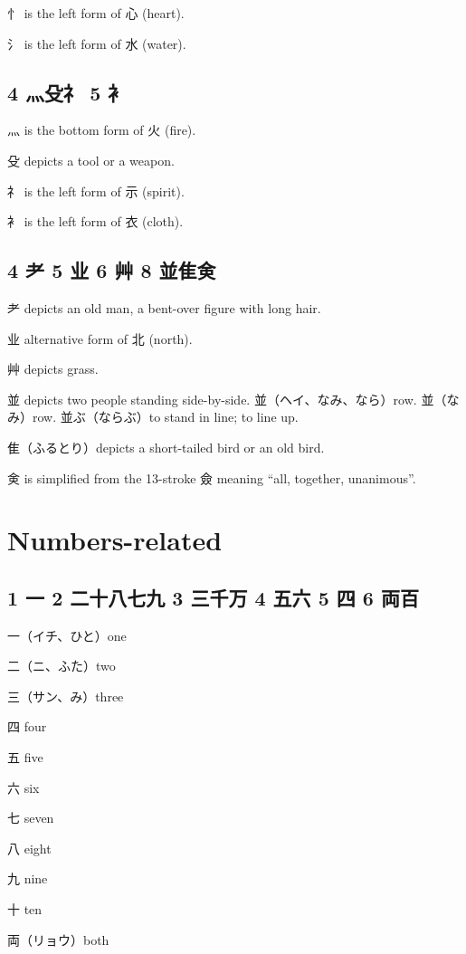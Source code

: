 忄 is the left form of 心 (heart).

氵 is the left form of 水 (water).

\subsection{4 灬殳礻 5 衤}

灬 is the bottom form of 火 (fire).

殳 depicts a tool or a weapon.

礻 is the left form of 示 (spirit).

衤 is the left form of 衣 (cloth).

\subsection{4 耂 5 业 6 艸 8 並隹㑒}

耂 depicts an old man, a bent-over figure with long hair.

业 alternative form of 北 (north).

艸 depicts grass.

並 depicts two people standing side-by-side.
並（ヘイ、なみ、なら）row.
並（なみ）row.
並ぶ（ならぶ）to stand in line; to line up.

隹（ふるとり）depicts a short-tailed bird or an old bird.

㑒 is simplified from the 13-stroke 僉
meaning ``all, together, unanimous''.

\section{Numbers-related}

\subsection{1 一 2 二十八七九 3 三千万 4 五六 5 四 6 両百}

一（イチ、ひと）one

二（ニ、ふた）two

三（サン、み）three

四 four

五 five

六 six

七 seven

八 eight

九 nine

十 ten

両（リョウ）both

